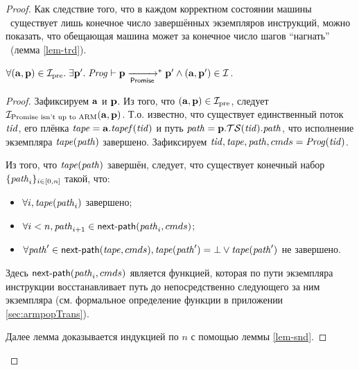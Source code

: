 \begin{proof}
Как следствие того, что в каждом корректном состоянии машины \ARMt~существует лишь
конечное число завершённых экземпляров инструкций, можно показать, что
обещающая машина может за конечное число шагов ``нагнать'' \ARMt~(лемма \ref{lem-trd}).
\begin{lemma}
\label{lem-trd}
$\forall (\mathbf{a}, \mathbf{p}) \in \mathcal{I}_{\textup{\rm pre}}. \;
\exists \mathbf{p}'. \; \mathit{Prog} \vdash \mathbf{p} \xrightarrow[\mathsf{Promise}]{}^{*} \mathbf{p}' \land (\mathbf{a}, \mathbf{p}') \in \mathcal{I}$.
\end{lemma}
\begin{proof}%
  Зафиксируем $\mathbf{a}$ и $\mathbf{p}$.
  Из того, что $(\mathbf{a}, \mathbf{p}) \in \mathcal{I}_{\textup{\rm pre}}$, следует $\mathcal{I}_{\textup{\rm Promise isn't up to ARM}}(\mathbf{a}, \mathbf{p})$.
  Т.о. известно, что существует единственный поток $\mathit{tid}$, его плёнка $\mathit{tape} = \mathbf{a}.\mathit{tapef}(\mathit{tid})$
  и путь $\mathit{path} = \mathbf{p}.\mathcal{TS}(\mathit{tid}).\mathit{path}$, что исполнение экземпляра $\mathit{tape}(\mathit{path})$ завершено.
  Зафиксируем $\mathit{tid}, \mathit{tape}, \mathit{path}, {cmds} = \mathit{Prog}(\mathit{tid})$.
  
  Из того, что $\mathit{tape}(\mathit{path})$ завершён, следует, что существует конечный набор
  $\{\mathit{path}_i\}_{i \in [0, n]}$ такой, что:
  \begin{itemize}
    \item $\forall i, \mathit{tape}(\mathit{path}_i)$ завершено;
    \item $\forall i < n, \mathit{path}_{i + 1} \in \mathsf{next}\textsf{-}\mathsf{path}(\mathit{path}_i, {cmds})$;
    \item $\forall \mathit{path}' \in \mathsf{next}\textsf{-}\mathsf{path}(\mathit{tape}, {cmds}), \mathit{tape}(\mathit{path}') = \bot \lor \mathit{tape}(\mathit{path}')$ не завершено.
  \end{itemize}
  Здесь $\mathsf{next}\textsf{-}\mathsf{path}(\mathit{path}_i, {cmds})$ является функцией, которая по пути экземпляра инструкции восстанавливает
  путь до непосредственно следующего за ним экземпляра (см. формальное определение функции в приложении \ref{sec:armpopTrans}).
  
  Далее лемма доказывается индукцией по $n$ с помощью леммы \ref{lem-snd}.
\end{proof}


\end{proof}
